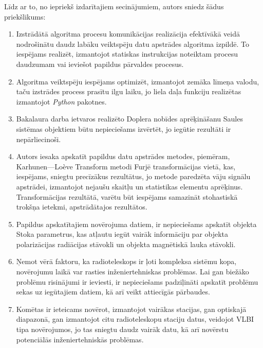 Līdz ar to, no iepriekš izdarītajiem secinājumiem, autors sniedz šādus priekšlikums:
\begin{enumerate}
    
    \item  Izstrādātā algoritma procesu komunikācijas realizācija efektīvākā veidā nodrošinātu daudz labāku veiktspēju datu apstrādes algoritma izpildē. To iespējams realizēt, izmantojot statiskas instrukcijas noteiktam procesu daudzumam vai ieviešot papildus pārvaldes procesus.
    \item Algoritma veiktspēju iespējams optimizēt, izmantojot zemāka līmeņa valodu, taču izstrādes process prasītu ilgu laiku, jo liela daļa funkciju realizētas izmantojot \textit{Python} pakotnes.
    \item Bakalaura darba ietvaros realizēto Doplera nobīdes aprēķināšanu Saules sistēmas objektiem būtu nepieciešams izvērtēt, jo iegūtie rezultāti ir nepārliecinoši.
    \item Autors iesaka apskatīt papildus datu apstrādes metodes, piemēram,  Karhunen—Loève Transform metodi Furjē transformācijas vietā, kas, iespējams, sniegtu precīzākus rezultātus, jo metode paredzēta vāju signālu apstrādei, izmantojot nejaušu skaitļu un statistikas elementu aprēķinus. Transformācijas rezultātā, varētu būt iespējams samazināt stohastiskā trokšņa ietekmi, apstrādātajos rezultātos.
    \item Papildus apskatītajiem novērojuma datiem, ir nepieciešams apskatīt objekta Stoka parametrus, kas atļautu iegūt vairāk informāciju par objekta polarizācijas radiācijas stāvokli un objekta magnētiskā lauka stāvokli.

    \item Ņemot vērā faktoru, ka radioteleskops ir ļoti kompleksa sistēmu kopa, novērojumu laikā var rasties inženiertehniskas problēmas. Lai gan biežāko problēmu risinājumi ir ieviesti, ir nepieciešams padziļināti apskatīt problēmu sekas uz iegūtajiem datiem, kā arī veikt attiecīgās pārbaudes.
    \item Komētas ir ieteicams novērot, izmantojot vairākas stacijas, gan optiskajā diapazonā, gan izmantojot citu radioteleskopu staciju datus, veidojot VLBI tipa novērojumos, jo tas sniegtu daudz vairāk datu, kā arī novērstu potenciālās inženiertehniskās problēmas.
\end{enumerate}

